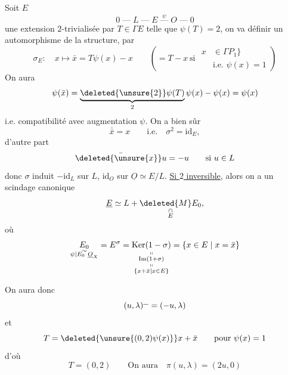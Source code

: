 Soit $E$
\[
0\mathrel{\text{---}}L\mathrel{\text{---}}E\overset{\psi}{\mathrel{\text{---}}}O\mathrel{\text{---}}0
\]
une extension $2$-trivialisée par $T\in\Gamma E$ telle que $\psi(T)=2$, on va définir un automorphisme de la structure, par
\[
\sigma_E:\quad x\longmapsto\bar{x}=T\psi(x)-x
\qquad\left(=T-x\ \text{si }
  \begin{aligned}x&\in\Gamma P_1\big\}\\[-2pt]
  &\text{i.e. }\psi(x)=1\end{aligned}\right)
\]
On aura
\[
\psi(\bar{x})=\underbrace{\deleted{\unsure{2}}\psi(T)}_{2}\psi(x)-\psi(x)=\psi(x)
\]
i.e. compatibilité avec augmentation $\psi$.
On a bien sûr
\[
\overline{\bar{x}}=x\qquad\text{i.e.}\quad\sigma^2=\mathrm{id}_E,
\]
d'autre part
\[
\bar{\deleted{\unsure{x}}u}=-u\qquad\text{si }u\in L
\]
donc $\sigma$ induit $-\mathrm{id}_L$ sur $L$, $\mathrm{id}_O$ sur $\underline O\simeq E/L$.
\uline{Si $2$ inversible}, alors on a un scindage canonique
\[
\underline E\simeq L+\underset{\substack{\cap\\E}}{\deleted{M}E_0},
\]
où
\[
\underset{\substack{\sim\\[-2pt]\psi|E_0\ \underline O_X}}{E_0}=E^\sigma=
\underset{\substack{\shortparallel\\\operatorname{Im}(1+\sigma)\\\shortparallel\\
\{x+\bar{x}\mid x\in E\}}}{\operatorname{Ker}(1-\sigma)}
=\{x\in E\mid x=\bar{x}\}
\]

On aura donc
\[
(u,\lambda)^{\rule{.62em}{.35pt}}=(-u,\lambda)
\]
et
\[
T=\deleted{\unsure{(0,2)\psi(x)}}x+\bar{x}\qquad\text{pour }\psi(x)=1
\]
d'où
\[
\boxed{T=(0,2)}\qquad\text{On aura}\quad\boxed{\pi(u,\lambda)=(2u,0)}
\]
